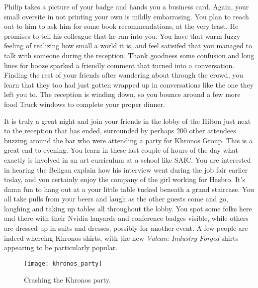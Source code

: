 \documentclass[../main.tex]{subfiles}
\begin{document}
Philip takes a picture of your badge and hands you a business card. Again, your small oversite in not printing your own is mildly embarrasing. You plan to reach out to him to ask him for some book recommendations, at the very least. He promises to tell his colleague that he ran into you. You have that warm fuzzy feeling of realizing how small a world it is, and feel satisifed that you managed to talk with someone during the reception. Thank goodness some confusion and long lines for booze sparked a friendly comment that turned into a conversation. Finding the rest of your friends after wandering about through the crowd, you learn that they too had just gotten wrapped up in conversations like the one they left you to. The reception is winding down, so you bounce around a few more food Truck windows to complete your proper dinner.

It is truly a great night and join your friends in the lobby of the Hilton just next to the reception that has ended, surrounded by perhaps 200 other attendees buzzing around the bar who were attending a party for Khronos Group. This is a great end to evening. You learn in these last couple of hours of the day what exactly is involved in an art curriculum at a school like SAIC. You are interested in hearing the Beligan explain how his interview went during the job fair earlier today, and you certainly enjoy the company of the girl working for Hasbro. It's damn fun to hang out at a your little table tucked beneath a grand staircase. You all take pulls from your beers and laugh as the other guests come and go, laughing and taking up tables all throughout the lobby. You spot some folks here and there with their Nvidia lanyards and conference badges visible, while others are dressed up in suits and dresses, possibly for another event. A few people are indeed whereing Khronos shirts, with the new \textit{Vulcan: Industry Forged} shirts appearing to be particularly popular. 

\begin{figure}[h!]
	\centering
	\texttt{[image: khronos\_party]}
	\caption*{Crashing the Khronos party.}
\end{figure}
\end{document}
